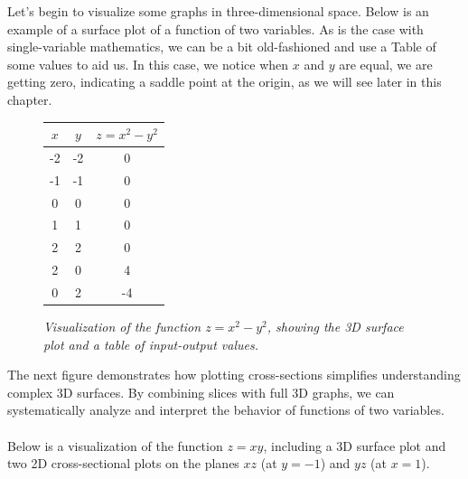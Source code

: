 \noindent Let's begin to visualize some graphs in three-dimensional space. Below is an example of a surface plot of a function of two variables. As is the case with single-variable mathematics, we can be a bit old-fashioned and use a Table of some values to aid us. In this case, we notice when $x$ and $y$ are equal, we are getting zero, indicating a saddle point at the origin, as we will see later in this chapter.

\begin{figure}[H]
    \centering
    \begin{minipage}{0.55\textwidth}
        \centering
    \end{minipage}%
    \hfill
    \begin{minipage}{0.4\textwidth}
        \centering
        \bigskip
        \begin{tabular}{ccc}
            \toprule
            \textbf{$x$} & \textbf{$y$} & \textbf{$z = x^2 - y^2$} \\
            \midrule
            -2 & -2 & 0 \\
            -1 & -1 & 0 \\
             0 &  0 & 0 \\
             1 &  1 & 0 \\
             2 &  2 & 0 \\
             2 &  0 & 4 \\
             0 &  2 & -4 \\
            \bottomrule
        \end{tabular}
    \end{minipage}
    \caption{\textit{Visualization of the function \( z = x^2 - y^2 \), showing the 3D surface plot and a table of input-output values.}}
    \label{fig:surface_table}
\end{figure}


\noindent The next figure demonstrates how plotting cross-sections simplifies understanding complex 3D surfaces. By combining slices with full 3D graphs, we can systematically analyze and interpret the behavior of functions of two variables. \\ \\ Below is a visualization of the function \( z = xy \), including a 3D surface plot and two 2D cross-sectional plots on the planes \( xz \) (at \( y=-1 \)) and \( yz \) (at \( x=1 \)).

